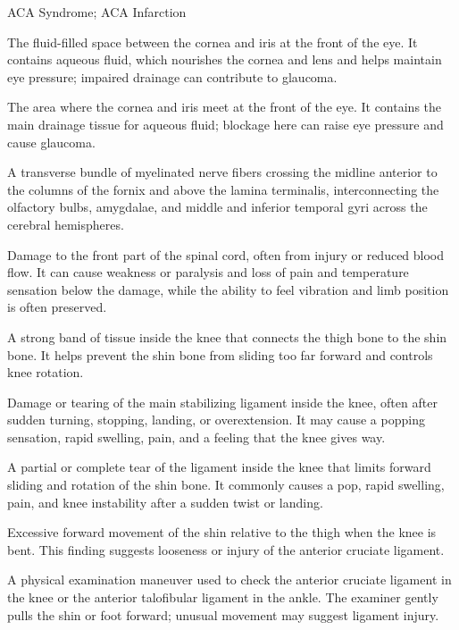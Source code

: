 \synonyms
ACA Syndrome; ACA Infarction

 The fluid-filled space between the cornea and iris at the front of the eye. It contains aqueous fluid, which nourishes the cornea and lens and helps maintain eye pressure; impaired drainage can contribute to glaucoma.

 The area where the cornea and iris meet at the front of the eye. It contains the main drainage tissue for aqueous fluid; blockage here can raise eye pressure and cause glaucoma.

 A transverse bundle of myelinated nerve fibers crossing the midline anterior to the columns of the fornix and above the lamina terminalis, interconnecting the olfactory bulbs, amygdalae, and middle and inferior temporal gyri across the cerebral hemispheres.

 Damage to the front part of the spinal cord, often from injury or reduced blood flow. It can cause weakness or paralysis and loss of pain and temperature sensation below the damage, while the ability to feel vibration and limb position is often preserved.

 A strong band of tissue inside the knee that connects the thigh bone to the shin bone. It helps prevent the shin bone from sliding too far forward and controls knee rotation.

 Damage or tearing of the main stabilizing ligament inside the knee, often after sudden turning, stopping, landing, or overextension. It may cause a popping sensation, rapid swelling, pain, and a feeling that the knee gives way.

 A partial or complete tear of the ligament inside the knee that limits forward sliding and rotation of the shin bone. It commonly causes a pop, rapid swelling, pain, and knee instability after a sudden twist or landing.

 Excessive forward movement of the shin relative
to the thigh when the knee is bent. This finding suggests looseness or injury
of the anterior cruciate ligament.

 A physical examination maneuver used to check
the anterior cruciate ligament in the knee or the anterior talofibular
ligament in the ankle. The examiner gently pulls the shin or foot forward;
unusual movement may suggest ligament injury.

